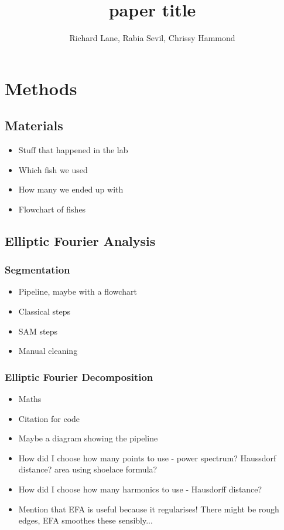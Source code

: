 \documentclass[11pt,a4paper,notitlepage]{article}
\author{Richard Lane, Rabia Sevil, Chrissy Hammond}
\title{
    paper title
}
\begin{document}
\maketitle

\cite{example2023}

\section{Methods}
\subsection{Materials}
\begin{itemize}
	\item Stuff that happened in the lab
	\item Which fish we used
	\item How many we ended up with
	\item Flowchart of fishes
\end{itemize}

\subsection{Elliptic Fourier Analysis}
\subsubsection{Segmentation}
\begin{itemize}
	\item Pipeline, maybe with a flowchart
	\item Classical steps
	\item SAM steps
	\item Manual cleaning
\end{itemize}

\subsubsection{Elliptic Fourier Decomposition}
\begin{itemize}
	\item Maths
	\item Citation for code
	\item Maybe a diagram showing the pipeline
	\item How did I choose how many points to use - power spectrum? Haussdorf distance? area using shoelace formula?
    \item How did I choose how many harmonics to use - Hausdorff distance?
    \item Mention that EFA is useful because it regularises! There might be rough edges, EFA smoothes these sensibly...
\end{itemize}
\end{document}
